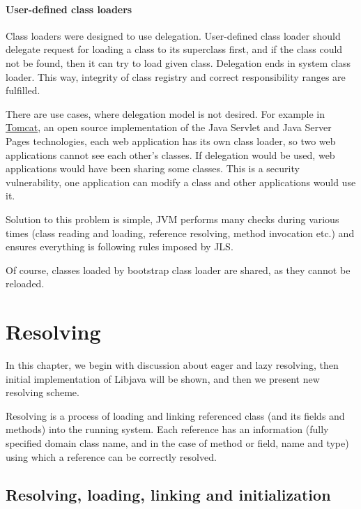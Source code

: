 \documentclass[11pt,twoside,a4paper]{book}
\let\Chapter\chapter
\def\chapter{\addtocontents{lol}{\protect\addvspace{10pt}}\Chapter}
\newcommand{\libjava}{{Libjava}}
\begin{document}
\subsubsection{User-defined class loaders}

Class loaders were designed to use delegation.
User-defined class loader should delegate request for loading a class to its superclass first, and if the class could not be found, then it can try to load given class. 
Delegation ends in system class loader. 
This way, integrity of class registry and correct responsibility ranges are fulfilled. 

There are use cases, where delegation model is not desired.
For example in \href{http://tomcat.apache.org}{Tomcat}, an open source implementation of the Java Servlet and Java Server Pages technologies, each web application has its own class loader, so two web applications cannot see each other's classes. 
If delegation would be used, web applications would have been sharing some classes. 
This is a security vulnerability, one application can modify a class and other applications would use it.

Solution to this problem is simple, JVM performs many checks during various times (class reading and loading, reference resolving, method invocation etc.) and ensures everything is following rules imposed by JLS.

Of course, classes loaded by bootstrap class loader are shared, as they cannot be reloaded.

\chapter{Resolving}
\label{chap:resolving}

In this chapter, we begin with discussion about eager and lazy resolving, then initial implementation of \libjava{} will be shown, and then we present new resolving scheme.

Resolving is a process of loading and linking referenced class (and its fields and methods) into the running system. 
Each reference has an information (fully specified domain class name\cite[section~4.3.1]{vmspec}, and in the case of method or field, name and type\cite[section~4.5.6]{vmspec}) using which a reference can be correctly resolved.

\section{Resolving, loading, linking and initialization}
\end{document}
